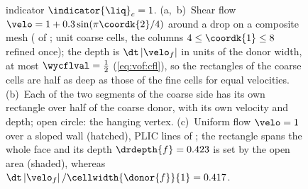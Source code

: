 \begin{figure}
{    indicator $\indicator{\liq}_c=1$. (a,~b)~Shear flow
    $\velo=1+0.3\sin(\pi\coordk{2}/4)$ around a drop on a composite mesh
    ( of ; unit coarse cells, the
    columns $4\le\coordk{1}\le8$ refined once); the depth is
    $\dt\abs{\velo_f}$ in units of the donor width, at most $\wycflval=\half$
    (\cref{eq:vof:cfl}), so the rectangles of the coarse cells are half as deep
    as those of the fine cells for equal velocities. (b)~Each of the two
    segments of the coarse side has its own rectangle over half of the coarse
    donor, with its own velocity and depth; open circle: the hanging vertex.
    (c)~Uniform flow $\velo=1$ over a sloped wall (hatched), PLIC lines of
    ; the rectangle spans the whole face and its depth
    $\drdepth{f}=\chkVofCutDepth$ is set by the open area (shaded), whereas
    $\dt\abs{\velo_f}/\cellwidth{\donor{f}}{1}=\chkVofCutExtrusion$.}
  \label{fig:vof:donating}
\end{figure}
